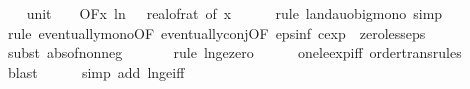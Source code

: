 \begin{isabellebody}
\isanewline
\ \ \isamarkupfalse%
\ unit{\isacharunderscore}{\kern0pt}{}{\isacharcolon}{\kern0pt}\ {\isachardoublequoteopen}{\isacharparenleft}{\kern0pt}{\isasymlambda}{\isacharunderscore}{\kern0pt}{\isachardot}{\kern0pt}\ {}{\isacharparenright}{\kern0pt}\ {\isasymin}\ O{\isacharbrackleft}{\kern0pt}{\isacharquery}{\kern0pt}F{\isacharbrackright}{\kern0pt}{\isacharparenleft}{\kern0pt}{\isasymlambda}x{\isachardot}{\kern0pt}\ ln\ {\isacharparenleft}{\kern0pt}{}\ {\isacharslash}{\kern0pt}\ real{\isacharunderscore}{\kern0pt}of{\isacharunderscore}{\kern0pt}rat\ {\isacharparenleft}{\kern0pt}{\isasymepsilon}{\isacharunderscore}{\kern0pt}of\ x{\isacharparenright}{\kern0pt}{\isacharparenright}{\kern0pt}{\isacharparenright}{\kern0pt}{\isachardoublequoteclose}\isanewline
\ \ \ \ \isamarkupfalse%
\ {\isacharparenleft}{\kern0pt}rule\ landau{\isacharunderscore}{\kern0pt}o{\isachardot}{\kern0pt}big{\isacharunderscore}{\kern0pt}mono{\isacharcomma}{\kern0pt}\ simp{\isacharparenright}{\kern0pt}\isanewline
\ \ \ \ \isamarkupfalse%
\ {\isacharparenleft}{\kern0pt}rule\ eventually{\isacharunderscore}{\kern0pt}mono{\isacharbrackleft}{\kern0pt}OF\ eventually{\isacharunderscore}{\kern0pt}conj{\isacharbrackleft}{\kern0pt}OF\ eps{\isacharunderscore}{\kern0pt}inf{\isacharbrackleft}{\kern0pt}\ c{\isacharequal}{\kern0pt}{\isachardoublequoteopen}exp\ {}{\isachardoublequoteclose}{\isacharbrackright}{\kern0pt}\ zero{\isacharunderscore}{\kern0pt}less{\isacharunderscore}{\kern0pt}eps{\isacharbrackright}{\kern0pt}{\isacharbrackright}{\kern0pt}{\isacharparenright}{\kern0pt}\isanewline
\ \ \ \ \isamarkupfalse%
\ {\isacharparenleft}{\kern0pt}subst\ abs{\isacharunderscore}{\kern0pt}of{\isacharunderscore}{\kern0pt}nonneg{\isacharparenright}{\kern0pt}\isanewline
\ \ \ \ \ \isamarkupfalse%
\ {\isacharparenleft}{\kern0pt}rule\ ln{\isacharunderscore}{\kern0pt}ge{\isacharunderscore}{\kern0pt}zero{\isacharparenright}{\kern0pt}\isanewline
\ \ \ \ \isamarkupfalse%
\ one{\isacharunderscore}{\kern0pt}le{\isacharunderscore}{\kern0pt}exp{\isacharunderscore}{\kern0pt}iff\ order{\isacharunderscore}{\kern0pt}trans{\isacharunderscore}{\kern0pt}rules{\isacharparenleft}{\kern0pt}{}{}{\isacharparenright}{\kern0pt}\ \isamarkupfalse%
\ blast\isanewline
\ \ \ \ \isamarkupfalse%
\ {\isacharparenleft}{\kern0pt}simp\ add{\isacharcolon}{\kern0pt}\ ln{\isacharunderscore}{\kern0pt}ge{\isacharunderscore}{\kern0pt}iff{\isacharparenright}{\kern0pt}\isanewline

\end{isabellebody}
